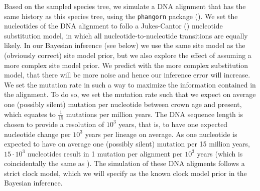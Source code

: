 \documentclass{article}
\begin{document}
Based on the sampled species tree, we simulate a DNA alignment that has the same history
as this species tree, using the \verb;phangorn; package (\cite{phangorn}). 
We set the nucleotides of the DNA alignment to follo a Jukes-Cantor (\cite{jc69})
nucleotide substitution model, in which all nucleotide-to-nucleotide transitions
are equally likely.
In our Bayesian inference (see below) we use the same site model as the (obviously correct) site model prior,
but we also explore the effect of assuming a more complex site model prior.
We predict with the more complex substitution model, 
that there will be more noise and hence our inference error will increase.
We set the mutation rate in such a way to maximize the information contained in the alignment.
To do so, we set the mutation rate such that we expect on average one (possibly silent) mutation per nucleotide
between crown age and present, which equates to $\frac{1}{15}$ mutations
per million years.
The DNA sequence length is chosen to provide a
resolution of $10^3$ years, 
that is, to have one expected nucleotide change 
per $10^3$ years per lineage on average. As one nucleotide is expected 
to have on average one (possibly silent) mutation per 15 million years, $15 \cdot 10^3$
nucleotides result in 1 mutation per alignment per $10^3$ years (which is
coincidentally the same as \cite{moller2018}). 
The simulation of these DNA aligments follows a strict clock model, 
which we will specify as the known clock model prior in the Bayesian inference.
\end{document}

